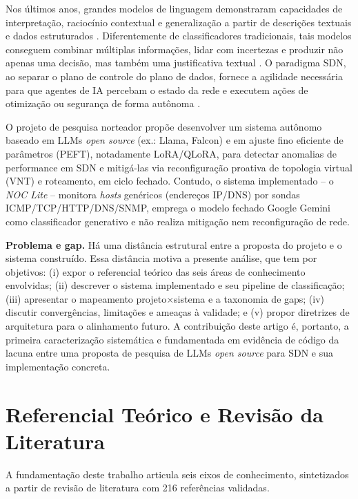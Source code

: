 \documentclass[12pt,a4paper]{article}
\begin{document}
Nos últimos anos, grandes modelos de linguagem demonstraram capacidades de
interpretação, raciocínio contextual e generalização a partir de descrições
textuais e dados estruturados \cite{rA31}. Diferentemente de classificadores
tradicionais, tais modelos conseguem combinar múltiplas informações, lidar com
incertezas e produzir não apenas uma decisão, mas também uma justificativa
textual \cite{rA321}. O paradigma SDN, ao separar o plano de controle do plano de
dados, fornece a agilidade necessária para que agentes de IA percebam o estado
da rede e executem ações de otimização ou segurança de forma autônoma \cite{rA19}.

O projeto de pesquisa norteador \cite{rRODRIGUES} propõe desenvolver um sistema
autônomo baseado em LLMs \textit{open source} (ex.: Llama, Falcon) e em
ajuste fino eficiente de parâmetros (PEFT), notadamente LoRA/QLoRA, para
detectar anomalias de performance em SDN e mitigá-las via reconfiguração
proativa de topologia virtual (VNT) e roteamento, em ciclo fechado. Contudo, o
sistema implementado -- o \textit{NOC Lite} -- monitora \textit{hosts}
genéricos (endereços IP/DNS) por sondas ICMP/TCP/HTTP/DNS/SNMP, emprega o
modelo fechado Google Gemini como classificador generativo e não realiza
mitigação nem reconfiguração de rede.

\textbf{Problema e gap.} Há uma distância estrutural entre a proposta do
projeto e o sistema construído. Essa distância motiva a presente análise, que
tem por objetivos: (i) expor o referencial teórico das seis áreas de
conhecimento envolvidas; (ii) descrever o sistema implementado e seu pipeline
de classificação; (iii) apresentar o mapeamento projeto$\times$sistema e a
taxonomia de gaps; (iv) discutir convergências, limitações e ameaças à
validade; e (v) propor diretrizes de arquitetura para o alinhamento futuro.
A contribuição deste artigo é, portanto, a primeira caracterização
sistemática e fundamentada em evidência de código da lacuna entre uma proposta
de pesquisa de LLMs \textit{open source} para SDN e sua implementação
concreta.

\section{Referencial Teórico e Revisão da Literatura}
\label{sec:referencial}

A fundamentação deste trabalho articula seis eixos de conhecimento, sintetizados
a partir de revisão de literatura com 216 referências validadas.
\end{document}
